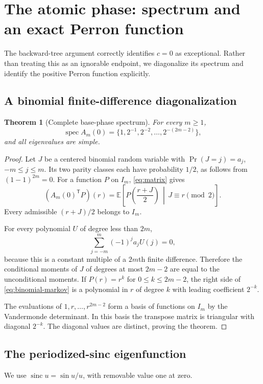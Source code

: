 \documentclass[11pt,a4paper]{article}
\numberwithin{equation}{section}
\newtheorem{theorem}{Theorem}[section]
\theoremstyle{definition}
\theoremstyle{remark}
\newcommand{\spec}{\operatorname{spec}}
\newcommand{\sinc}{\operatorname{sinc}}
\begin{document}
\section{The atomic phase: spectrum and an exact Perron function}
\label{sec:atomic}
The backward-tree argument correctly identifies $c=0$ as exceptional.
Rather than treating this as an ignorable endpoint, we diagonalize its
spectrum and identify the positive Perron function explicitly.

\subsection{A binomial finite-difference diagonalization}
\begin{theorem}[Complete base-phase spectrum]
\label{thm:base-spectrum}
For every $m\geq1$,
\[
 \spec A_m(0)=\{1,2^{-1},2^{-2},\ldots,2^{-(2m-2)}\},
\]
and all eigenvalues are simple.
\end{theorem}
\begin{proof}
Let $J$ be a centered binomial random variable with
$\Pr(J=j)=a_j$, $-m\leq j\leq m$. Its two parity classes each have
probability $1/2$, as follows from $(1-1)^{2m}=0$.
For a function $P$ on $I_m$, \cref{eq:matrix} gives
\begin{equation}
 (A_m(0)^{\mathsf T}P)(r)
 =\mathbb E\!\left[P\left(\frac{r+J}{2}\right)
     \,\middle|\, J\equiv r\pmod2\right].
 \label{eq:binomial-markov}
\end{equation}
Every admissible $(r+J)/2$ belongs to $I_m$.

For every polynomial $U$ of degree less than $2m$,
\[
 \sum_{j=-m}^m(-1)^j a_jU(j)=0,
\]
because this is a constant multiple of a $2m$th finite difference.
Therefore the conditional moments of $J$ of degrees at most $2m-2$
are equal to the unconditional moments. If $P(r)=r^k$ for
$0\leq k\leq2m-2$, the right side of \cref{eq:binomial-markov} is a
polynomial in $r$ of degree $k$ with leading coefficient $2^{-k}$.

The evaluations of $1,r,\ldots,r^{2m-2}$ form a basis of functions on
$I_m$ by the Vandermonde determinant. In this basis the transpose
matrix is triangular with diagonal $2^{-k}$. The diagonal values are
distinct, proving the theorem.
\end{proof}

\subsection{The periodized-sinc eigenfunction}
We use $\sinc u=\sin u/u$, with removable value one at zero.
\end{document}
